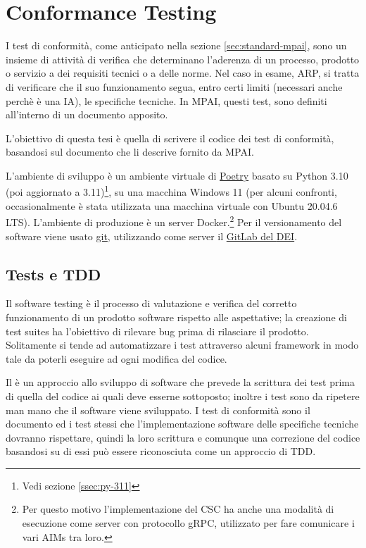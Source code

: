 
\chapter{Conformance Testing} \label{chp:conformancetesting}    %
I test di conformità, come anticipato nella sezione \ref{sec:standard-mpai}, sono un insieme di attività di verifica che determinano l'aderenza di un processo, prodotto o servizio a dei requisiti tecnici o a delle norme.
Nel caso in esame, \ac{ARP}, si tratta di verificare che il suo funzionamento segua, entro certi limiti (necessari anche perchè è una IA), le specifiche tecniche. In \ac{MPAI}, questi test, sono definiti all'interno di un documento apposito.

L'obiettivo di questa tesi è quella di scrivere il codice dei test di conformità, basandosi sul documento che li descrive fornito da MPAI.

L'ambiente di sviluppo è un ambiente virtuale di \href{https://python-poetry.org/}{Poetry} basato su Python 3.10 (poi aggiornato a 3.11)\footnote{Vedi sezione \ref{ssec:py-311}}, su una macchina Windows 11 (per alcuni confronti, occasionalmente è stata utilizzata una macchina virtuale con Ubuntu 20.04.6 LTS). L'ambiente di produzione è un server Docker.\footnote{Per questo motivo l'implementazione del CSC ha anche una modalità di esecuzione come server con protocollo gRPC, utilizzato per fare comunicare i vari \acp{AIM} tra loro.} Per il versionamento del software viene usato \href{https://git-scm.com/}{git}, utilizzando come server il \href{https://gitlab.dei.unipd.it/}{GitLab del \ac{DEI}}.


\section{Tests e \acl{TDD}} \label{sec:tests-tdd}
Il software testing è il processo di valutazione e verifica del corretto funzionamento di un prodotto software rispetto alle aspettative; la creazione di test suites ha l'obiettivo di rilevare bug prima di rilasciare il prodotto.
Solitamente si tende ad automatizzare i test attraverso alcuni framework in modo tale da poterli eseguire ad ogni modifica del codice.

Il  è un approccio allo sviluppo di software che prevede la scrittura dei test prima di quella del codice ai quali deve esserne sottoposto; inoltre i test sono da ripetere man mano che il software viene sviluppato.
I test di conformità sono il documento ed i test stessi che l'implementazione software delle specifiche tecniche dovranno rispettare, quindi la loro scrittura e comunque una correzione del codice basandosi su di essi può essere riconosciuta come un approccio di \ac{TDD}. %


